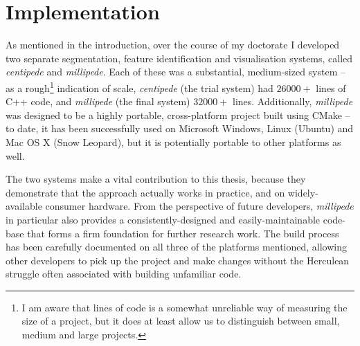 \section{Implementation}

\enlargethispage*{\baselineskip}

As mentioned in the introduction, over the course of my doctorate I developed two separate segmentation, feature identification and visualisation systems, called \emph{centipede} and \emph{millipede}. Each of these was a substantial, medium-sized system -- as a rough\footnote{I am aware that lines of code is a somewhat unreliable way of measuring the size of a project, but it does at least allow us to distinguish between small, medium and large projects.} indication of scale, \emph{centipede} (the trial system) had $26000+$ lines of C++ code, and \emph{millipede} (the final system) $32000+$ lines. Additionally, \emph{millipede} was designed to be a highly portable, cross-platform project built using CMake -- to date, it has been successfully used on Microsoft Windows, Linux (Ubuntu) and Mac OS X (Snow Leopard), but it is potentially portable to other platforms as well.

The two systems make a vital contribution to this thesis, because they demonstrate that the approach actually works in practice, and on widely-available consumer hardware. From the perspective of future developers, \emph{millipede} in particular also provides a consistently-designed and easily-maintainable code-base that forms a firm foundation for further research work. The build process has been carefully documented on all three of the platforms mentioned, allowing other developers to pick up the project and make changes without the Herculean struggle often associated with building unfamiliar code.

